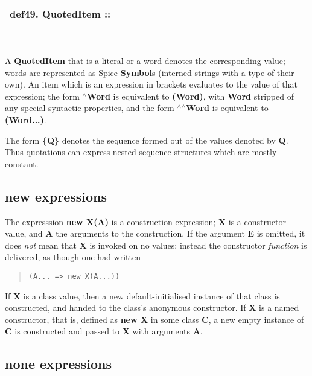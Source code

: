 \documentclass{report}
\begin{document}
\begin{tabular}{l}
{\bf def49. QuotedItem ::= }\\ 
\hspace*{3mm}{\tt Word} \\ 
\hspace*{3mm}{\tt  $\mid$ "\{" QuotedItems "\}"} \\ 
\hspace*{3mm}{\tt  $\mid$ "(" Expr ")"} \\ 
\hspace*{3mm}{\tt  $\mid$ "$^\wedge$" Word} \\ 
\hspace*{3mm}{\tt  $\mid$ "$^\wedge$$^\wedge$" Word} \\ 
\hspace*{3mm}{\tt  $\mid$ Literal} \\ 
\end{tabular}

A {\bf QuotedItem} that is a literal or a word denotes the corresponding value;
words are represented as Spice {\bf Symbol}s (interned strings with a type of
their own). An item which is an expression in brackets evaluates to the
value of that expression; the form {\bf $^\wedge$Word} is equivalent to {\bf (Word)},
with {\bf Word} stripped of any special syntactic properties, and the form
{\bf $^\wedge$$^\wedge$Word} is equivalent to {\bf (Word...)}.

The form {\bf \{Q\}} denotes the sequence formed out of the values denoted by {\bf Q}.
Thus quotations can express nested sequence structures which are mostly
constant.\subsection{new expressions}


The expresssion {\bf new X(A)} is a construction expression; {\bf X} is a constructor
value, and {\bf A} the arguments to the construction. If the argument {\bf E} is
omitted, it does {\em not} mean that {\bf X} is invoked on no values; instead
the constructor {\em function} is delivered, as though one had written

\begin{quote}
\begin{verbatim}
(A... => new X(A...))
\end{verbatim}
\end{quote}
If {\bf X} is a class value, then a new default-initialised instance of that class
is constructed, and handed to the class's anonymous constructor. If {\bf X} is a
named constructor, that is, defined as {\bf new X} in some class {\bf C}, a new empty
instance of {\bf C} is constructed and passed to {\bf X} with arguments {\bf A}.\subsection{none expressions}
\end{document}
